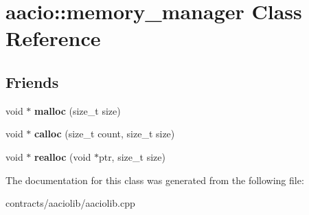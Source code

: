 \hypertarget{classaacio_1_1memory__manager}{}\section{aacio\+:\+:memory\+\_\+manager Class Reference}
\label{classaacio_1_1memory__manager}
\subsection*{Friends}
\begin{DoxyCompactItemize}
\item 
void $\ast$ {\bfseries malloc} (size\+\_\+t size)
\item 
void $\ast$ {\bfseries calloc} (size\+\_\+t count, size\+\_\+t size)
\item 
void $\ast$ {\bfseries realloc} (void $\ast$ptr, size\+\_\+t size)
\end{DoxyCompactItemize}


The documentation for this class was generated from the following file\+:\begin{DoxyCompactItemize}
\item 
contracts/aaciolib/aaciolib.\+cpp\end{DoxyCompactItemize}
